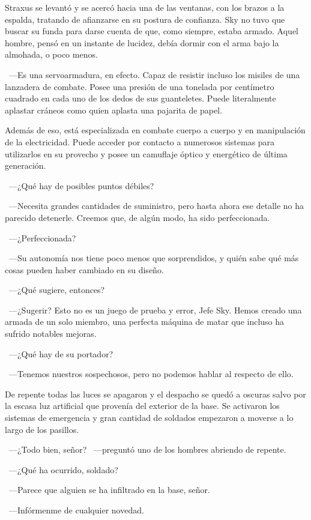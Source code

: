 Straxus se levantó y se acercó hacia una de las ventanas, con los brazos a la espalda, tratando de afianzarse en su postura de confianza. Sky no tuvo que buscar su funda para darse cuenta de que, como siempre, estaba armado. Aquel hombre, pensó en un instante de lucidez, debía dormir con el arma bajo la almohada, o poco menos.

~---Es una servoarmadura, en efecto. Capaz de resistir incluso los misiles de una lanzadera de combate. Posee una presión de una tonelada por centímetro cuadrado en cada uno de los dedos de sus guanteletes. Puede literalmente aplastar cráneos como quien aplasta una pajarita de papel.

\rquoti{}Además de eso, está especializada en combate cuerpo a cuerpo y en manipulación de la electricidad. Puede acceder por contacto a numerosos sistemas para utilizarlos en su provecho y posee un camuflaje óptico y energético de última generación.

~---¿Qué hay de posibles puntos débiles?

~---Necesita grandes cantidades de suministro, pero hasta ahora ese detalle no ha parecido detenerle. Creemos que, de algún modo, ha sido perfeccionada.

~---¿Perfeccionada?

~---Su autonomía nos tiene poco menos que sorprendidos, y quién sabe qué más cosas pueden haber cambiado en su diseño.

~---¿Qué sugiere, entonces?

~---¿Sugerir? Esto no es un juego de prueba y error, Jefe Sky. Hemos creado una armada de un solo miembro, una perfecta máquina de matar que incluso ha sufrido notables mejoras.

~---¿Qué hay de su portador?

~---Tenemos nuestros sospechosos, pero no podemos hablar al respecto de ello.

De repente todas las luces se apagaron y el despacho se quedó a oscuras salvo por la escasa luz artificial que provenía del exterior de la base. Se activaron los sistemas de emergencia y gran cantidad de soldados empezaron a moverse a lo largo de los pasillos.

~---¿Todo bien, señor? ~---preguntó uno de los hombres abriendo de repente.

~---¿Qué ha ocurrido, soldado?

~---Parece que alguien se ha infiltrado en la base, señor.

~---Infórmenme de cualquier novedad.


